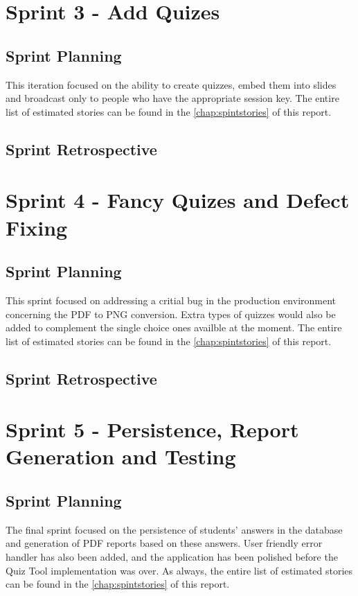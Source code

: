 \section{Sprint 3 - Add Quizes}
\subsection{Sprint Planning}
This iteration focused on the ability to create quizzes, embed them into slides and
broadcast only to people who have the appropriate session key. The entire list of estimated stories
can be found in the \autoref{chap:spintstories} of this report.

\subsection{Sprint Retrospective}


\section{Sprint 4 - Fancy Quizes and Defect Fixing}
\subsection{Sprint Planning}
This sprint focused on addressing a critial bug in the production environment
concerning the PDF to PNG conversion. Extra types of quizzes would also be added
to complement the single choice ones availble at the moment. The entire list of estimated stories
can be found in the \autoref{chap:spintstories} of this report.

\subsection{Sprint Retrospective}
\section{Sprint 5 - Persistence, Report Generation and Testing}
\subsection{Sprint Planning}
The final sprint focused on the persistence of students' answers in the database and
generation of PDF reports based on these answers. User friendly error handler has
also been added, and the application has been polished before the Quiz Tool implementation
was over. As always, the entire list of estimated stories
can be found in the \autoref{chap:spintstories} of this report.

